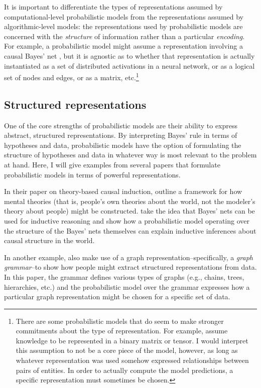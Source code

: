 \documentclass[12pt]{article}
\begin{document}
It is important to differentiate the types of representations assumed by computational-level probabilistic models from the representations assumed by algorithmic-level models: the representations used by probabilistic models are concerned with the \textit{structure} of information rather than a particular \textit{encoding}. For example, a probabilistic model might assume a representation involving a causal Bayes' net \citep{Griffiths2009}, but it is agnostic as to whether that representation is actually instantiated as a set of distributed activations in a neural network, or as a logical set of nodes and edges, or as a matrix, etc.\footnote{There are some probabilistic models that do seem to make stronger commitments about the type of representation. For example, \cite{Kemp2010} assume knowledge to be represented in a binary matrix or tensor. I would interpret this assumption to not be a core piece of the model, however, as long as whatever representation was used somehow expressed relationships between pairs of entities. In order to actually compute the model predictions, a specific representation must sometimes be chosen.}

\subsection*{Structured representations}

One of the core strengths of probabilistic models are their ability to express abstract, structured representations. By interpreting Bayes' rule in terms of hypotheses and data, probabilistic models have the option of formulating the structure of hypotheses and data in whatever way is most relevant to the problem at hand. Here, I will give examples from several papers that formulate probabilistic models in terms of powerful representations.

In their paper on theory-based causal induction, \cite{Griffiths2009} outline a framework for how mental theories (that is, people's own theories about the world, not the modeler's theory about people) might be constructed. \cite{Griffiths2009} take the idea that Bayes' nets can be used for inductive reasoning and show how a probabilistic model operating over the structure of the Bayes' nets themselves can explain inductive inferences about causal structure in the world.

In another example, \cite{Kemp2008} also make use of a graph representation--specifically, a \textit{graph grammar}--to show how people might extract structured representations from data. In this paper, the grammar defines various types of graphs (e.g., chains, trees, hierarchies, etc.) and the probabilistic model over the grammar expresses how a particular graph representation might be chosen for a specific set of data.
\end{document}
